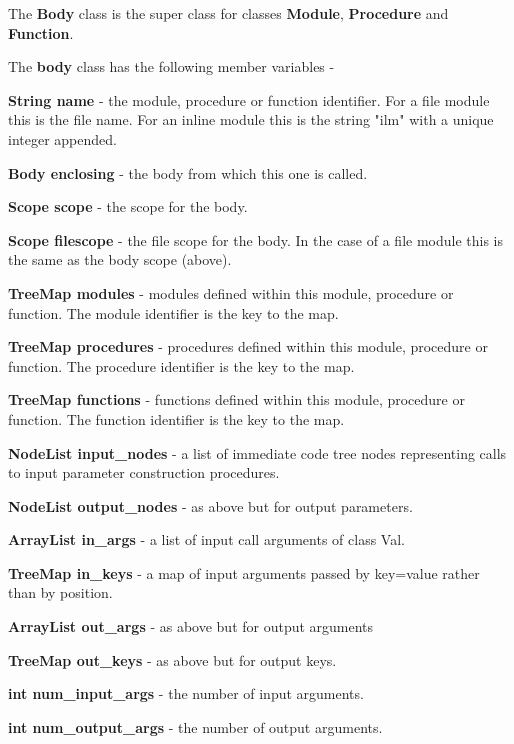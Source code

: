 \documentclass[10pt,a4paper,twoside,fleqn]{book}
\begin{document}
            The {\bf Body} class is the super class for classes {\bf Module}, {\bf
            Procedure} and {\bf Function}.

            The {\bf body} class has the following member variables -

            {\bf String name} - the module, procedure or function identifier. For
            a file module this is the file name. For an inline module this is the
            string "ilm" with a unique integer appended.

            {\bf Body enclosing} - the body from which this one is called.

            {\bf Scope scope} - the scope for the body.

            {\bf Scope filescope} - the file scope for the body. In the case of a
            file module this is the same as the body scope (above).

            {\bf TreeMap   modules} - modules defined within this module,
            procedure or function. The module identifier is the key to the map.

            {\bf TreeMap   procedures} - procedures defined within this module,
            procedure or function. The procedure identifier is the key to the map.

            {\bf TreeMap   functions} - functions defined within this module,
            procedure or function. The function identifier is the key to the map.

            {\bf NodeList input\_nodes } - a list of immediate code tree nodes
            representing calls to input parameter construction procedures.

            {\bf NodeList output\_nodes } - as above but for output parameters.

            {\bf ArrayList in\_args} - a list of input call arguments of class
            Val.

            {\bf TreeMap in\_keys} - a map of input arguments passed by key=value
            rather than by position.
            
            {\bf ArrayList out\_args} - as above but for output arguments

            {\bf TreeMap out\_keys} - as above but for output keys.

            {\bf int num\_input\_args} - the number of input arguments.

            {\bf int num\_output\_args} - the number of output arguments.
\end{document}
